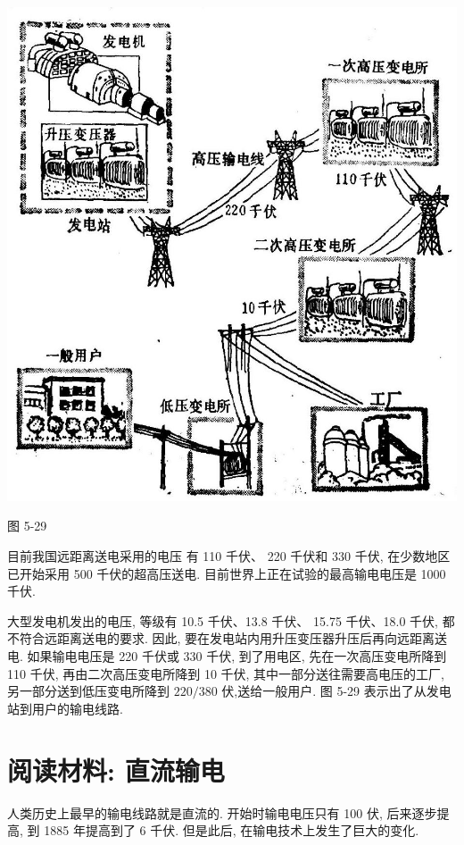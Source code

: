 \documentclass[10pt]{article}
\begin{document}
\begin{center}
\includegraphics[max width=1.0\textwidth]{images/01913056-1f15-74d8-9184-9aab52c9d66b_186_766556.jpg}
\end{center}

图 5-29

目前我国远距离送电采用的电压 有 110 千伏、 220 千伏和 330 千伏, 在少数地区已开始采用 500 千伏的超高压送电. 目前世界上正在试验的最高输电电压是 1000 千伏.

大型发电机发出的电压, 等级有 10.5 千伏、13.8 千伏、 15.75 千伏、18.0 千伏, 都不符合远距离送电的要求. 因此, 要在发电站内用升压变压器升压后再向远距离送电. 如果输电电压是 220 千伏或 330 千伏, 到了用电区, 先在一次高压变电所降到 110 千伏, 再由二次高压变电所降到 10 千伏, 其中一部分送往需要高电压的工厂, 另一部分送到低压变电所降到 \({220}/{380}\) 伏,送给一般用户. 图 5-29 表示出了从发电站到用户的输电线路.

\section*{阅读材料: 直流输电}

人类历史上最早的输电线路就是直流的. 开始时输电电压只有 100 伏, 后来逐步提高, 到 1885 年提高到了 6 千伏. 但是此后, 在输电技术上发生了巨大的变化.
\end{document}
